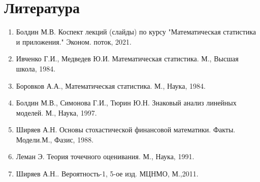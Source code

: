 \section{Литература}
\begin{enumerate}
    \item Болдин М.В. Коспект лекций (слайды) по курсу "Математическая статистика и приложения." Эконом. поток, 2021.
    \item Ивченко Г.И., Медведев Ю.И. Математическая статистика. М., Высшая школа, 1984.
    \item Боровков А.А., Математическая статистика. М., Наука, 1984.
    \item Болдин М.В., Симонова Г.И., Тюрин Ю.Н. Знаковый анализ линейных моделей. М., Наука, 1997.
    \item Ширяев А.Н. Основы стохастической финансовой математики. Факты. Модели.М., Фазис, 1988.
    \item Леман Э. Теория точечного оценивания. М., Наука, 1991.
    \item Ширяев А.Н.. Вероятность-1, 5-ое изд. МЦНМО, М.,2011.
\end{enumerate}
